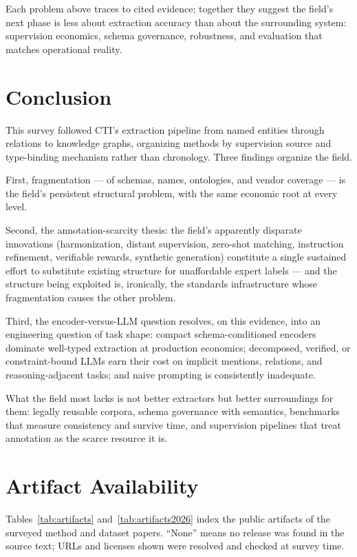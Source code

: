 \documentclass[11pt]{article}
\begin{document}
Each problem above traces to cited evidence; together they suggest the field's next phase is less about extraction accuracy than about the surrounding system: supervision economics, schema governance, robustness, and evaluation that matches operational reality.

\section{Conclusion}

This survey followed CTI's extraction pipeline from named entities through relations to knowledge graphs, organizing methods by supervision source and type-binding mechanism rather than chronology. Three findings organize the field.

First, fragmentation — of schemas, names, ontologies, and vendor coverage — is the field's persistent structural problem, with the same economic root at every level.

Second, the annotation-scarcity thesis: the field's apparently disparate innovations (harmonization, distant supervision, zero-shot matching, instruction refinement, verifiable rewards, synthetic generation) constitute a single sustained effort to substitute existing structure for unaffordable expert labels — and the structure being exploited is, ironically, the standards infrastructure whose fragmentation causes the other problem.

Third, the encoder-versus-LLM question resolves, on this evidence, into an engineering question of task shape: compact schema-conditioned encoders dominate well-typed extraction at production economics; decomposed, verified, or constraint-bound LLMs earn their cost on implicit mentions, relations, and reasoning-adjacent tasks; and naive prompting is consistently inadequate.

What the field most lacks is not better extractors but better surroundings for them: legally reusable corpora, schema governance with semantics, benchmarks that measure consistency and survive time, and supervision pipelines that treat annotation as the scarce resource it is.

\appendix
\section{Artifact Availability}

Tables~\ref{tab:artifacts} and~\ref{tab:artifacts2026} index the public artifacts of the surveyed
method and dataset papers. ``None'' means no release was found in the
source text; URLs and licenses shown were resolved and checked at
survey time.
\end{document}
